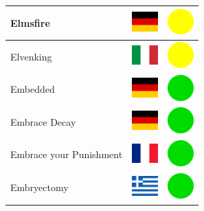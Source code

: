 \documentclass[12pt, a4paper, twoside]{report}
\begin{document}
\begin{center}
\begin{longtable}{|p{5cm}|p{2cm}|p{2cm}|}
 Elmsfire                                                   & \includegraphics[width=1cm]{../img/flags/de} &   \includegraphics[width=1cm]{../likes/m} \\ \hline
 Elvenking                                                  & \includegraphics[width=1cm]{../img/flags/it} &   \includegraphics[width=1cm]{../likes/m} \\ \hline
 Embedded                                                   & \includegraphics[width=1cm]{../img/flags/de} &   \includegraphics[width=1cm]{../likes/y} \\ \hline
 Embrace Decay                                              & \includegraphics[width=1cm]{../img/flags/de} &   \includegraphics[width=1cm]{../likes/y} \\ \hline
 Embrace your Punishment                                    & \includegraphics[width=1cm]{../img/flags/fr} &   \includegraphics[width=1cm]{../likes/y} \\ \hline
 Embryectomy                                                & \includegraphics[width=1cm]{../img/flags/gr} &   \includegraphics[width=1cm]{../likes/y} \\ \hline

\end{longtable}
\end{center}
\end{document}
